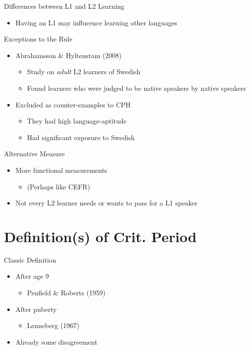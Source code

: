 \documentclass{beamer}
\begin{document}
\begin{frame}{Differences between L1 and L2 Learning}
  \begin{itemize}
    \item Having an L1 may influcence learning other languages
  \end{itemize}
\end{frame}

\begin{frame}{Exceptions to the Rule}
  \begin{itemize}
    \item Abrahamsson \& Hyltenstam (2008)
    \begin{itemize}
      \item Study on \emph{adult} L2 learners of Swedish
      \item Found learners who were judged to be native speakers by native speakers
    \end{itemize}
    \item Excluded as counter-examples to CPH
    \begin{itemize}
      \item They had high language-aptitude
      \item Had significant exposure to Swedish
    \end{itemize}
  \end{itemize}
\end{frame}

\begin{frame}{Alternative Measure}
  \begin{itemize}
    \item More functional measurements
    \begin{itemize}
      \item (Perhaps like CEFR\footnotemark {})
    \end{itemize}
    \item Not every L2 learner needs or wants to pass for a L1 speaker
  \end{itemize}
\end{frame}

\section{Definition(s) of Crit. Period}

\begin{frame}{Classic Definition}
  \begin{itemize}
    \item After age 9
    \begin{itemize}
      \item Penfield \& Roberts (1959)
    \end{itemize}
    \item After puberty
    \begin{itemize}
      \item Lenneberg (1967)
    \end{itemize}
    \item Already some disagreement
  \end{itemize}
\end{frame}
\end{document}
